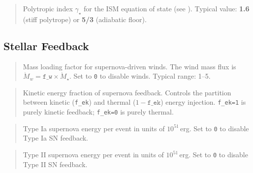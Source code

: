 \begin{quote}
Polytropic index $\gamma_\star$ for the ISM equation of state (see
).  Typical value: \textbf{1.6} (stiff polytrope)
or \textbf{5/3} (adiabatic floor).
\end{quote}

\subsection{Stellar Feedback}

\label{param:f_w}

\begin{quote}
Mass loading factor for supernova-driven winds.  The wind mass flux
is $\dot{M}_w = \texttt{f\_w} \times \dot{M}_\star$.  Set to
\texttt{0} to disable winds.  Typical range: 1--5.
\end{quote}

\label{param:f_ek}

\begin{quote}
Kinetic energy fraction of supernova feedback.  Controls the
partition between kinetic (\texttt{f\_ek}) and thermal
($1 - \texttt{f\_ek}$) energy injection.  \texttt{f\_ek=1} is
purely kinetic feedback; \texttt{f\_ek=0} is purely thermal.
\end{quote}

\label{param:eps_sn1}

\begin{quote}
Type Ia supernova energy per event in units of $10^{51}\,$erg.
Set to \texttt{0} to disable Type Ia SN feedback.
\end{quote}

\label{param:eps_sn2}

\begin{quote}
Type II supernova energy per event in units of $10^{51}\,$erg.
Set to \texttt{0} to disable Type II SN feedback.
\end{quote}

\label{param:yieldtablefilename}


